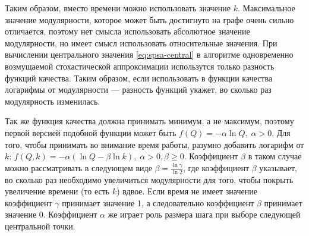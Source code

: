 Таким образом, вместо времени можно использовать значение $k$. Максимальное значение модулярности, которое может быть достигнуто на графе очень сильно отличается, поэтому нет смысла использовать абсолютное значение модулярности, но имеет смысл использовать относительные значения. При вычислении центрального значения \eqref{eq:spsa-central} в алгоритме одновременно возмущаемой стохастической аппроксимации использутся только разность функций качества. Таким образом, если использовать в функции качества логарифмы от модулярности --- разность функций укажет, во сколько раз модулярность изменилась.

Так же функция качества должна принимать минимум, а не максимум, поэтому первой версией подобной функции может быть $f(Q) = -\alpha \ln Q,\;\alpha > 0$. Для того, чтобы принимать во внимание время работы, разумно добавить логарифм от $k$: $f(Q, k) = -\alpha (\ln Q - \beta \ln k),\;\alpha > 0, \beta \ge 0$. Коэффициент $\beta$ в таком случае можно рассматривать в следующем виде $\beta = \frac{\ln \gamma}{\ln 2}$, где коэффициент $\beta$ указывает, во сколько раз необходимо увеличиться модулярности для того, чтобы покрыть увеличение времени (то есть $k$) вдвое. Если время не имеет значение коэффициент $\gamma$ принимает значение 1, а следовательно коэффициент $\beta$ принимает значение 0. Коэффициент $\alpha$ же играет роль размера шага при выборе следующей центральной точки.


